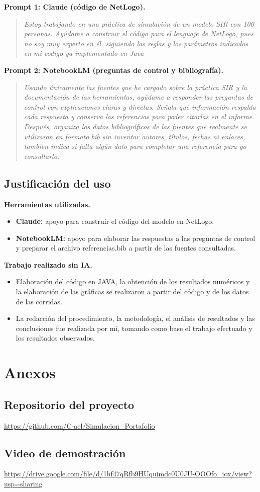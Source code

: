 \documentclass[11pt,a4paper]{article}
\begin{document}
\textbf{Prompt 1: Claude (código de NetLogo).}
\begin{quote}\small
\textit{Estoy trabajando en una práctica de simulación de un modelo SIR con 100 personas. Ayúdame a construir el código para el lenguaje de NetLogo, pues no soy muy experto en él. siguiendo las reglas y los parámetros indicados en mi codigo ya implementado en Java}
\end{quote}

\textbf{Prompt 2: NotebookLM (preguntas de control y bibliografía).}
\begin{quote}\small
\textit{Usando únicamente las fuentes que he cargado sobre la práctica SIR y la documentación de las herramientas, ayúdame a responder las preguntas de control con explicaciones claras y directas. Señala qué información respalda cada respuesta y conserva las referencias para poder citarlas en el informe. Después, organiza los datos bibliográficos de las fuentes que realmente se utilizaron en formato.bib sin inventar autores, títulos, fechas ni enlaces, tambien indica si falta algún dato para completar una referencia para yo consultarlo.}
\end{quote}

\subsection{Justificación del uso}
\textbf{Herramientas utilizadas.}
\begin{itemize}
  \item \textbf{Claude:} apoyo para construir el código del modelo en NetLogo.
  \item \textbf{NotebookLM:} apoyo para elaborar las respuestas a las preguntas de control y preparar el archivo referencias.bib a partir de las fuentes consultadas.
\end{itemize}

\textbf{Trabajo realizado sin IA.}
\begin{itemize}
  \item Elaboración del código en JAVA, la obtención de los resultados numéricos y la elaboración de las gráficas se realizaron a partir del código y de los datos de las corridas.
  \item La redacción del procedimiento, la metodología, el análisis de resultados y las conclusiones fue realizada por mí, tomando como base el trabajo efectuado y los resultados observados.
\end{itemize}

\FloatBarrier
{}
\renewcommand{\refname}{\thesection. Bibliografía}



\section{Anexos}
\subsection{Repositorio del proyecto}
\url{https://github.com/C-ael/Simulacion_Portafolio}

\subsection{Video de demostración}
\url{https://drive.google.com/file/d/1hf47qRfb9HUquimdc0U0JU-OOOfo_iox/view?usp=sharing}
\end{document}
